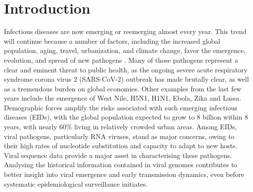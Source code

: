 \chapter{Introduction}\label{ch:introduction}



Infectious diseases are now emerging or reemerging almost every year.
This trend will continue because a number of factors, including the increased global population, aging, travel, urbanization, and climate change, favor the emergence, evolution, and spread of new pathogens \cite{Bloom2017}. %
Many of those pathogens represent a clear and eminent threat to public health, as the ongoing severe acute respiratory syndrome corona virus 2 (SARS-CoV-2) outbreak has made brutally clear, as well as a tremendous burden on global economies.
Other examples from the last few years include the emergence of West Nile\cite{ng}, H5N1\cite{moncla}, H1N1\cite{h1n1}, Ebola\cite{dudas}, Zika\cite{zibra} and Lassa\cite{kafetzopoulou2019metagenomic}.
Demographic forces amplify the risks associated with such emerging infectious diseases (EIDs), with the global population expected to grow to 8 billion within 8 years, with nearly 60\% living in relatively crowded urban areas.
Among EIDs, viral pathogens, particularly RNA viruses, stand as major concerns, owing to their high rates of nucleotide substitution and capacity to adapt to new hosts.
Viral sequence data provide a major asset in characterising these pathogens.
Analysing the historical information contained in viral genomes contributes to better insight into viral emergence and early transmission dynamics, even before systematic epidemiological surveillance initiates.

